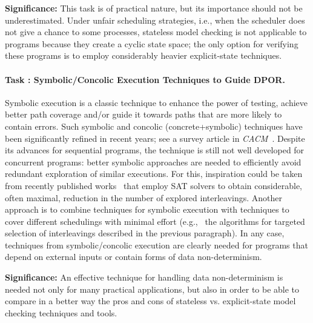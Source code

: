 \documentclass[11pt]{article}
\newcounter{Task}
\newcommand{\task}[1]{\addtocounter{Task}{1}\paragraph{Task \theTask: #1}}
\newcommand{\significance}[1]{\vspace*{-0.5em}%
  \begin{quoting}\noindent\textbf{Significance:} #1\end{quoting}}
\newcommand{\myparagraph}{}
\let\myparagraph=\paragraph
\renewcommand{\paragraph}{\vspace{-3mm}\myparagraph}
\newcommand{\eg}{e.\/g.,\ }
\begin{document}
{\significance{This task is of practical nature, but its importance should
  not be underestimated.  Under unfair scheduling strategies, i.e., when
  the scheduler does not give a chance to some processes, stateless model
  checking is not applicable to programs because they create a cyclic state
  space; the only option for verifying these programs is to employ
  considerably heavier explicit-state techniques.}

\task{Symbolic/Concolic Execution Techniques to Guide DPOR.}
Symbolic execution is a classic technique to enhance the power of testing,
achieve better path coverage and/or guide it towards paths that are more
likely to contain errors. Such symbolic and concolic (concrete+symbolic)
techniques have been significantly refined in recent years; see a survey
article in \textit{CACM}~\cite{SymbolicTesting@CACM-13}.
Despite its advances for sequential programs, the
technique is still not well developed for concurrent programs: better
symbolic approaches are needed to efficiently avoid redundant
exploration of similar executions. For this, inspiration could be
taken from recently published
works~\cite{MCR@PLDI-15,SATCheck@OOPSLA-15,MCR-TSO@OOPSLA-16} that employ
SAT solvers to obtain considerable, often maximal, reduction in the number
of explored interleavings.
%
Another approach is to combine techniques for symbolic execution with
techniques to cover different schedulings with minimal effort (\eg
the algorithms for targeted selection of interleavings described in
the previous paragraph).
%
In any case, techniques from symbolic/concolic execution are clearly needed
for programs that depend on external inputs or contain forms of data
non-determinism.

\significance{An effective technique for handling data non-determinism is
  needed not only for many practical applications, but also in order to be
  able to compare in a better way the pros and cons of stateless vs.\/
  explicit-state model checking techniques and tools.}
}
\end{document}
